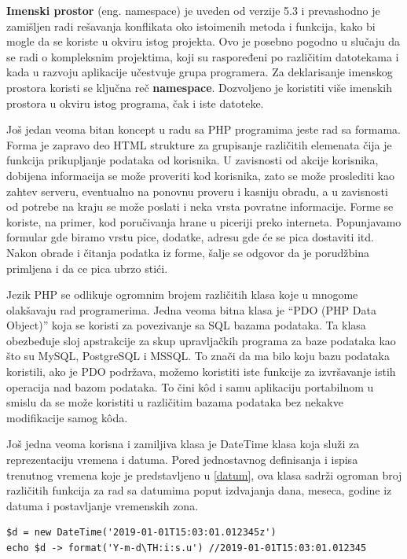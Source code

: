 \documentclass[a4paper]{article}
\begin{document}
{\textbf{Imenski prostor} (eng. namespace) \cite{phpSrbija} je uveden od verzije 5.3 i prevashodno je zamišljen radi rešavanja konflikata oko istoimenih metoda i funkcija, kako bi mogle da se koriste u okviru istog projekta. Ovo je posebno pogodno u slučaju da se radi o kompleksnim projektima, koji su raspoređeni po različitim datotekama i kada u razvoju aplikacije učestvuje grupa programera. Za deklarisanje imenskog prostora koristi se ključna reč \textbf{namespace}. Dozvoljeno je koristiti više imenskih prostora u okviru istog programa, čak i iste datoteke.

Još jedan veoma bitan koncept u radu sa PHP programima jeste rad sa formama. Forma je zapravo deo HTML strukture za grupisanje različitih elemenata čija je funkcija prikupljanje podataka od korisnika. U zavisnosti od akcije korisnika, dobijena informacija se može proveriti kod korisnika, zato se može proslediti kao zahtev serveru, eventualno na ponovnu proveru i kasniju obradu, a u zavisnosti od potrebe na kraju se može poslati i neka vrsta povratne informacije. Forme se koriste, na primer, kod poručivanja hrane u piceriji preko interneta. Popunjavamo formular gde biramo vrstu pice, dodatke, adresu gde će se pica dostaviti itd. Nakon obrade i čitanja podatka iz forme, šalje se odgovor da je porudžbina primljena i da ce pica ubrzo stići.

Jezik PHP se odlikuje ogromnim brojem različitih klasa koje u mnogome olakšavaju rad programerima. Jedna veoma bitna klasa je “PDO (PHP Data Object)”\cite{PHPtheGoodParts, phpSrbija} koja se koristi za povezivanje sa SQL bazama podataka. Ta klasa obezbeđuje sloj apstrakcije za skup upravljačkih programa za baze podataka kao što su MySQL, PostgreSQL i MSSQL. To znači da ma bilo koju bazu podataka koristili, ako je PDO podržava, možemo koristiti iste funkcije za izvršavanje istih operacija nad bazom podataka. To čini k\^{o}d i samu aplikaciju portabilnom u smislu da se može koristiti u različitim bazama podataka bez nekakve modifikacije samog k\^{o}da.

Još jedna veoma korisna i zamiljiva klasa je DateTime klasa \cite{PHPtheGoodParts, phpSrbija} koja služi za reprezentaciju vremena i datuma. Pored jednostavnog definisanja i ispisa trenutnog vremena koje je predstavljeno u \ref{datum}, ova klasa sadrži ogroman broj različitih funkcija za rad sa datumima poput izdvajanja dana, meseca, godine iz datuma i postavljanje vremenskih zona. 

\begin{lstlisting}[caption={Primer iz klase DateTime},frame=single, label=datum]
$d = new DateTime('2019-01-01T15:03:01.012345z')
echo $d -> format('Y-m-d\TH:i:s.u') //2019-01-01T15:03:01.012345
\end{lstlisting}

}
\end{document}
